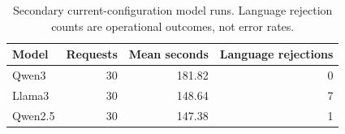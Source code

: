 \begin{table}[htbp]\centering\small
\caption{Secondary current-configuration model runs. Language rejection counts are operational outcomes, not error rates.}
\begin{tabularx}{\linewidth}{Xrrr}\toprule
Model & Requests & Mean seconds & Language rejections\\\midrule
Qwen3 & 30 & 181.82 & 0\\
Llama3 & 30 & 148.64 & 7\\
Qwen2.5 & 30 & 147.38 & 1\\
\bottomrule\end{tabularx}\end{table}
